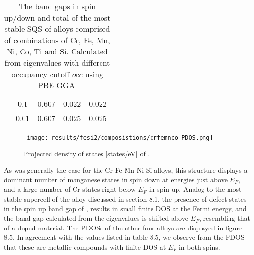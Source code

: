 \begin{table}[H]
\begin{tabular}{@{}ccccc@{}}
\multicolumn{1}{c|}{}                             & \multicolumn{1}{c|}{0.1}  & 0.607                                                                         & 0.022                                                                        & 0.022                                                                         \\
\multicolumn{1}{c|}{}                             & \multicolumn{1}{c|}{0.01}                      & 0.607                                                                         & 0.025                                                                        & 0.025                                                                         \\ \bottomrule
\end{tabular}
\caption{The band gaps in spin up/down and total of the most stable SQS of alloys comprised of combinations of Cr, Fe, Mn, Ni, Co, Ti and Si. Calculated from eigenvalues with different occupancy cutoff $occ$ using PBE GGA.}
\end{table}

\begin{figure}[H]
\centering
\texttt{[image: results/fesi2/composistions/crfemnco\_PDOS.png]}
\caption{Projected density of states [states/eV] of .}
\end{figure}

As was generally the case for the Cr-Fe-Mn-Ni-Si alloys, this structure displays a dominant number of manganese states in spin down at energies just above $E_F$, and a large number of Cr states right below $E_F$ in spin up. Analog to the most stable supercell of the  alloy discussed in section 8.1, the presence of defect states in the spin up band gap of , results in small finite DOS at the Fermi energy, and the band gap calculated from the eigenvalues is shifted above $E_F$, resembling that of a doped material. The PDOSs of the other four alloys are displayed in figure 8.5. In agreement with the values listed in table 8.5, we observe from the PDOS that these are metallic compounds with finite DOS at $E_F$ in both spins. 
 

